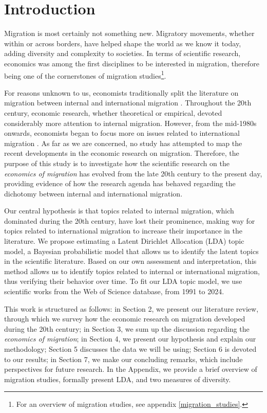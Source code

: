 \section{Introduction} \label{introduction}

Migration is most certainly not something new. Migratory movements, whether within or across borders, have helped shape the world as we know it today, adding diversity and complexity to societies. In terms of scientific research, economics was among the first disciplines to be interested in migration, therefore being one of the cornerstones of migration studies\footnote{For an overview of migration studies, see appendix \ref{migration_studies}.}\citep{greenwood_early_2003, levy_between_2020, scholten_introduction_2022}.

For reasons unknown to us, economists traditionally split the literature on migration between internal and international migration \citep{cohen_introduction_1996, cushing_crossing_2004, king_mind_2010}. Throughout the 20th century, economic research, whether theoretical or empirical, devoted considerably more attention to internal migration. However, from the mid-1980s onwards, economists began to focus more on issues related to international migration \citep{lalonde_economic_1997, cushing_crossing_2004, card_is_2005}. As far as we are concerned, no study has attempted to map the recent developments in the economic research on migration. Therefore, the purpose of this study is to investigate how the scientific research on the \textit{economics of migration} has evolved from the late 20th century to the present day, providing evidence of how the research agenda has behaved regarding the dichotomy between internal and international migration.

Our central hypothesis is that topics related to internal migration, which dominated during the 20th century, have lost their prominence, making way for topics related to international migration to increase their importance in the literature. We propose estimating a Latent Dirichlet Allocation (LDA) topic model, a Bayesian probabilistic model that allows us to identify the latent topics in the scientific literature. Based on our own assessment and interpretation, this method allows us to identify topics related to internal or international migration, thus verifying their behavior over time. To fit our LDA topic model, we use scientific works from the Web of Science database, from 1991 to 2024.

This work is structured as follows: in Section 2, we present our literature review, through which we survey how the economic research on migration developed during the 20th century; in Section 3, we sum up the discussion regarding the \textit{economics of migration}; in Section 4, we present our hypothesis and explain our methodology; Section 5 discusses the data we will be using; Section 6 is devoted to our results; in Section 7, we make our concluding remarks, which include perspectives for future research. In the Appendix, we provide a brief overview of migration studies, formally present LDA, and two measures of diversity.